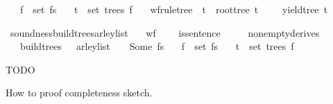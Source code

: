 \begin{isabellebody}
\ \ \ {\isachardoublequoteopen}f\ {\isasymin}\ set\ fs{\isachardoublequoteclose}\isanewline
\ \ \ {\isachardoublequoteopen}t\ {\isasymin}\ set\ {\isacharparenleft}{\kern0pt}trees\ f{\isacharparenright}{\kern0pt}{\isachardoublequoteclose}\isanewline
\ \ \ {\isachardoublequoteopen}wf{\isacharunderscore}{\kern0pt}rule{\isacharunderscore}{\kern0pt}tree\ {\isasymG}\ t\ {\isasymand}\ root{\isacharunderscore}{\kern0pt}tree\ t\ {\isacharequal}{\kern0pt}\ {\isasymSS}\ {\isasymG}\ {\isasymand}\ yield{\isacharunderscore}{\kern0pt}tree\ t\ {\isacharequal}{\kern0pt}\ {\isasymomega}{\isachardoublequoteclose}%
\isadelimproof
%
\endisadelimproof
%
\isatagproof
%
\endisatagproof
{\isafoldproof}%
%
\isadelimproof
%
\endisadelimproof
%
\begin{isamarkuptext}%
%
\end{isamarkuptext}\isamarkuptrue%
\isamarkupfalse%
\ soundness{\isacharunderscore}{\kern0pt}build{\isacharunderscore}{\kern0pt}trees{\isacharunderscore}{\kern0pt}{\isasymE}arley{\isacharunderscore}{\kern0pt}list{\isacharcolon}{\kern0pt}\isanewline
\ \ \ {\isachardoublequoteopen}wf{\isacharunderscore}{\kern0pt}{\isasymG}\ {\isasymG}{\isachardoublequoteclose}\isanewline
\ \ \ {\isachardoublequoteopen}is{\isacharunderscore}{\kern0pt}sentence\ {\isasymG}\ {\isasymomega}{\isachardoublequoteclose}\isanewline
\ \ \ {\isachardoublequoteopen}nonempty{\isacharunderscore}{\kern0pt}derives\ {\isasymG}{\isachardoublequoteclose}\isanewline
\ \ \ {\isachardoublequoteopen}build{\isacharunderscore}{\kern0pt}trees\ {\isasymG}\ {\isasymomega}\ {\isacharparenleft}{\kern0pt}{\isasymE}arley{\isacharunderscore}{\kern0pt}list\ {\isasymG}\ {\isasymomega}{\isacharparenright}{\kern0pt}\ {\isacharequal}{\kern0pt}\ Some\ fs{\isachardoublequoteclose}\isanewline
\ \ \ {\isachardoublequoteopen}f\ {\isasymin}\ set\ fs{\isachardoublequoteclose}\isanewline
\ \ \ {\isachardoublequoteopen}t\ {\isasymin}\ set\ {\isacharparenleft}{\kern0pt}trees\ f{\isacharparenright}{\kern0pt}{\isachardoublequoteclose}\isanewline
\ \ \ {\isachardoublequoteopen}{\isasymG}\ {\isasymturnstile}\ {\isacharbrackleft}{\kern0pt}{\isasymSS}\ {\isasymG}{\isacharbrackright}{\kern0pt}\ {\isasymRightarrow}\isactrlsup {\isacharasterisk}{\kern0pt}\ {\isasymomega}{\isachardoublequoteclose}%
\isadelimproof
%
\endisadelimproof
%
\isatagproof
%
\endisatagproof
{\isafoldproof}%
%
\isadelimproof
%
\endisadelimproof
%
\begin{isamarkuptext}%
%
\end{isamarkuptext}\isamarkuptrue%
%
\isadelimdocument
%
\endisadelimdocument
%
\isatagdocument
%
\isamarkuptrue%
%
\endisatagdocument
{\isafolddocument}%
%
\isadelimdocument
%
\endisadelimdocument
%
\begin{isamarkuptext}%
TODO%
\end{isamarkuptext}\isamarkuptrue%
%
\begin{isamarkuptext}%
How to proof completeness sketch.


\end{isamarkuptext}
\end{isabellebody}
